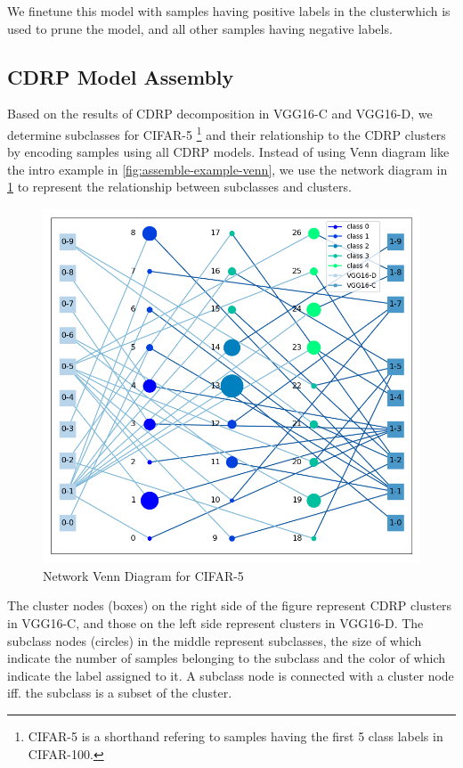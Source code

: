 \documentclass[sigplan,10pt,review]{acmart}\settopmatter{printfolios=true,printccs=false,printacmref=false}
\newcommand{\todo}[1]{\textcolor{red}{[TODO: #1]}}
\begin{document}
We finetune this model with samples having positive labels in the clusterwhich is used to prune the model, and all other samples having negative labels. 

\subsection{CDRP Model Assembly}
Based on the results of CDRP decomposition in VGG16-C and VGG16-D, we determine subclasses for CIFAR-5	\footnote{CIFAR-5 is a shorthand refering to samples having the first 5 class labels in CIFAR-100.} and their relationship to the CDRP clusters by encoding samples using all CDRP models.
Instead of using Venn diagram like the intro example in \cref{fig:assemble-example-venn}, we use the network diagram in \cref{fig:network-venn} to represent the relationship between subclasses and clusters.

\begin{figure}[h]
	\centering
	\includegraphics[width=\linewidth]{fig/network_venn.png}
	\caption{Network Venn Diagram for CIFAR-5}
	\label{fig:network-venn}
\end{figure}

The cluster nodes (boxes) on the right side of the figure represent CDRP clusters in VGG16-C, and those on the left side represent clusters in VGG16-D.
The subclass nodes (circles) in the middle represent subclasses, the size of which indicate the number of samples belonging to the subclass and the color of which indicate the label assigned to it.
A subclass node is connected with a cluster node iff. the subclass is a subset of the cluster.
\end{document}

